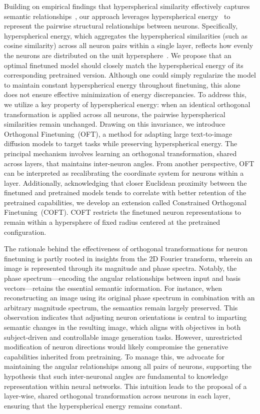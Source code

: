 Building on empirical findings that hyperspherical similarity effectively captures semantic relationships~\cite{liu2017deep,liu2018decoupled,chen2020angular}, our approach leverages hyperspherical energy~\cite{liu2018learning} to represent the pairwise structural relationships between neurons. Specifically, hyperspherical energy, which aggregates the hyperspherical similarities (such as cosine similarity) across all neuron pairs within a single layer, reflects how evenly the neurons are distributed on the unit hypersphere~\cite{liu2021learning}. We propose that an optimal finetuned model should closely match the hyperspherical energy of its corresponding pretrained version. Although one could simply regularize the model to maintain constant hyperspherical energy throughout finetuning, this alone does not ensure effective minimization of energy discrepancies. To address this, we utilize a key property of hyperspherical energy: when an identical orthogonal transformation is applied across all neurons, the pairwise hyperspherical similarities remain unchanged. Drawing on this invariance, we introduce Orthogonal Finetuning~(OFT), a method for adapting large text-to-image diffusion models to target tasks while preserving hyperspherical energy. The principal mechanism involves learning an orthogonal transformation, shared across layers, that maintains inter-neuron angles. From another perspective, OFT can be interpreted as recalibrating the coordinate system for neurons within a layer. Additionally, acknowledging that closer Euclidean proximity between the finetuned and pretrained models tends to correlate with better retention of the pretrained capabilities, we develop an extension called Constrained Orthogonal Finetuning~(COFT). COFT restricts the finetuned neuron representations to remain within a hypersphere of fixed radius centered at the pretrained configuration.

The rationale behind the effectiveness of orthogonal transformations for neuron finetuning is partly rooted in insights from the 2D Fourier transform, wherein an image is represented through its magnitude and phase spectra. Notably, the phase spectrum—encoding the angular relationships between input and basis vectors—retains the essential semantic information. For instance, when reconstructing an image using its original phase spectrum in combination with an arbitrary magnitude spectrum, the semantics remain largely preserved. This observation indicates that adjusting neuron orientations is central to imparting semantic changes in the resulting image, which aligns with objectives in both subject-driven and controllable image generation tasks. However, unrestricted modification of neuron directions would likely compromise the generative capabilities inherited from pretraining. To manage this, we advocate for maintaining the angular relationships among all pairs of neurons, supporting the hypothesis that such inter-neuronal angles are fundamental to knowledge representation within neural networks. This intuition leads to the proposal of a layer-wise, shared orthogonal transformation across neurons in each layer, ensuring that the hyperspherical energy remains constant.

